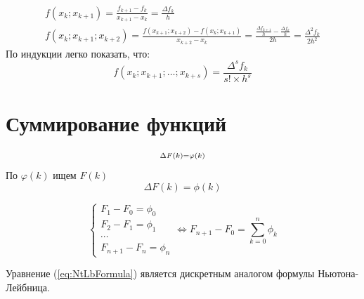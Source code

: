 \documentclass[a4paper,11pt]{article}
\begin{document}
  \begin{gather*}
    f(x_k; x_{k+1}) = \frac{f_{k+1} - f_k}{x_{k+1} - x_k} = \frac{\Delta f_k}{h} \\
    f(x_k; x_{k+1}; x_{k+2}) = \frac{f(x_{k+1}; x_{k+2}) - f(x_k; x_{k+1})}{x_{k+2} - x_k}
        = \frac{\frac{\Delta f_{k+1}}{h} - \frac{\Delta f_k}{h}}{2h} = \frac{\Delta^2 f_k}{2h^2}
  \end{gather*}
  По индукции легко показать, что: \\
  \[f(x_k; x_{k+1}; \dots; x_{k+s}) = \frac{\Delta^s f_k}{s! \times h^s}\]
\newpage

\section{Суммирование функций}
\marginpar
{
  \begin{gather*}
    \begin{subarray}{1}
      \Delta F(k)= \varphi (k) \\
    \end{subarray}
  \end{gather*}
  \footnotesize По $\varphi (k)$ ищем $F(k)$
}
\begin{equation}
  \Delta F(k) = \phi(k)
\end{equation}

\begin{equation}
  \begin{cases}
    F_1 - F_0 = \phi_0 \\
    F_2 - F_1 = \phi_1 \\
    \cdots \\
    F_{n+1} - F_n = \phi_n
  \end{cases} \Leftrightarrow F_{n+1} - F_0 = \sum_{k=0}^{n} \phi_k
  \label{eq:NtLbFormula}
\end{equation}

Уравнение (\ref{eq:NtLbFormula}) является дискретным аналогом формулы Ньютона-Лейбница.
\end{document}
